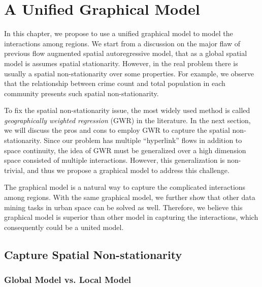 \chapter{A Unified Graphical Model}

\label{ch:crf}


In this chapter, we propose to use a unified graphical model to model the interactions among regions. We start from a discussion on the major flaw of previous flow augmented spatial autoregressive model, that as a global spatial model is assumes spatial stationarity. However, in the real problem there is usually a spatial non-stationarity over some properties. For example, we observe that the relationship between crime count and total population in each community presents such spatial non-stationarity.

To fix the spatial non-stationarity issue, the most widely used method is called \emph{geographically weighted regression} (GWR) in the literature. In the next section, we will discuss the pros and cons to employ GWR to capture the spatial non-stationarity. Since our problem has multiple ``hyperlink'' flows in addition to space continuity, the idea of GWR must be generalized over a high dimension space consisted of multiple interactions. However, this generalization is non-trivial, and thus we propose a graphical model to address this challenge.



The graphical model is a natural way to capture the complicated interactions among regions.
With the same graphical model, we further show that other data mining tasks in urban space can be solved as well.  Therefore, we believe this graphical model is superior than other model in capturing the interactions, which consequently could be a united model.



\section{Capture Spatial Non-stationarity}

\subsection{Global Model vs. Local Model}


